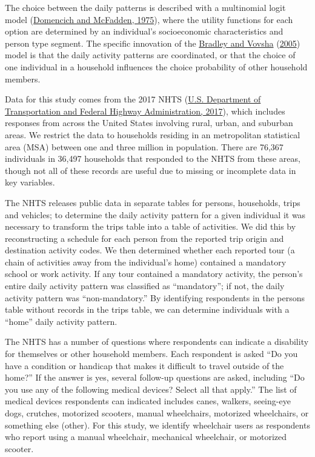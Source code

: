 \documentclass[3p, authoryear, review]{elsarticle} %
\begin{document}
The choice between the daily patterns is described with a multinomial logit
model (\protect\hyperlink{ref-Domencich1975}{Domencich and McFadden, 1975}), where the utility functions for each option are
determined by an individual's socioeconomic characteristics and person type
segment. The specific innovation of the \protect\hyperlink{ref-Bradley2005}{Bradley and Vovsha} (\protect\hyperlink{ref-Bradley2005}{2005}) model is that the daily
activity patterns are coordinated, or that the choice of one individual in a
household influences the choice probability of other household members.

Data for this study comes from the 2017 NHTS (\protect\hyperlink{ref-fhwa2017}{U.S. Department of Transportation and Federal Highway Administration, 2017}), which includes
responses from across the United States involving rural, urban, and suburban
areas. We restrict the data to households residing in an metropolitan statistical
area (MSA) between one and three million in population. There are
76,367 individuals in 36,497 households that responded to the NHTS from these
areas, though not all of these records are useful due to missing or incomplete
data in key variables.

The NHTS releases public data in separate tables for persons, households,
trips and vehicles; to determine the daily activity pattern for a given
individual it was necessary to transform the trips table into a table of
activities. We did this by reconstructing a schedule for each person from the
reported trip origin and destination activity codes. We then determined whether
each reported tour (a chain of activities away from the individual's home)
contained a mandatory school or work activity. If any tour contained a mandatory
activity, the person's entire daily activity pattern was classified as ``mandatory'';
if not, the daily activity pattern was ``non-mandatory.'' By identifying respondents
in the persons table without records in the trips table, we can determine
individuals with a ``home'' daily activity pattern.

The NHTS has a number of questions where respondents can indicate a disability
for themselves or other household members. Each respondent is asked ``Do you
have a condition or handicap that makes it difficult to travel outside of the
home?'' If the answer is yes, several follow-up questions are asked, including
``Do you use any of the following medical devices? Select all that apply.'' The
list of medical devices respondents can indicated includes canes, walkers,
seeing-eye dogs, crutches, motorized scooters, manual wheelchairs,
motorized wheelchairs, or something else (other).
For this study, we identify wheelchair users as respondents who report using a
manual wheelchair, mechanical wheelchair, or motorized scooter.
\end{document}

